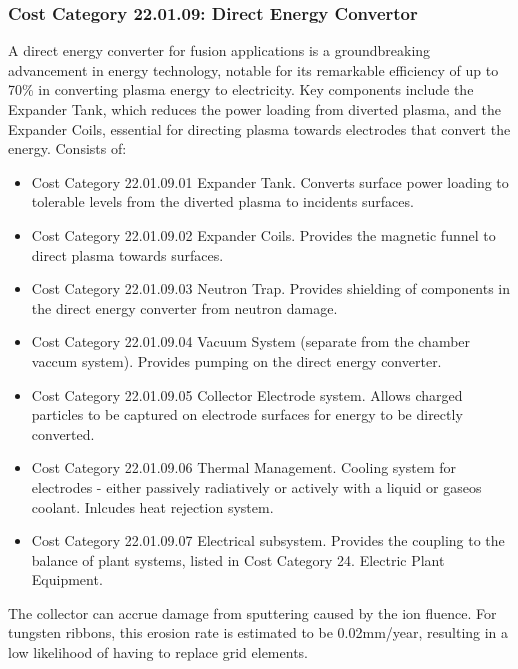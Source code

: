 
\subsubsection*{Cost Category 22.01.09: Direct Energy Convertor}

A direct energy converter for fusion applications is a groundbreaking advancement in energy technology, notable for its remarkable efficiency of up to 70\% in converting plasma energy to electricity. Key components include the Expander Tank, which reduces the power loading from diverted plasma, and the Expander Coils, essential for directing plasma towards electrodes that convert the energy.  Consists of:

\begin{itemize}
    \item Cost Category 22.01.09.01 Expander Tank. Converts surface power loading to tolerable levels from the diverted plasma to incidents surfaces.
    \item Cost Category 22.01.09.02 Expander Coils.  Provides the magnetic funnel to direct plasma towards surfaces.
    \item Cost Category 22.01.09.03 Neutron Trap.  Provides shielding of components in the direct energy converter from neutron damage.
    \item Cost Category 22.01.09.04 Vacuum System (separate from the chamber vaccum system).  Provides pumping on the direct energy converter.
    \item Cost Category 22.01.09.05 Collector Electrode system.  Allows charged particles to be captured on electrode surfaces for energy to be directly converted.
    \item Cost Category 22.01.09.06 Thermal Management.  Cooling system for electrodes - either passively radiatively or actively with a liquid or gaseos coolant.  Inlcudes heat rejection system.
    \item Cost Category 22.01.09.07 Electrical subsystem.  Provides the coupling to the balance of plant systems, listed in Cost Category 24. Electric Plant Equipment.
\end{itemize}


The collector can accrue damage from sputtering caused by the ion fluence. For tungsten ribbons, this erosion rate is estimated to be 0.02mm/year, resulting in a low likelihood of having to replace grid elements.\\

